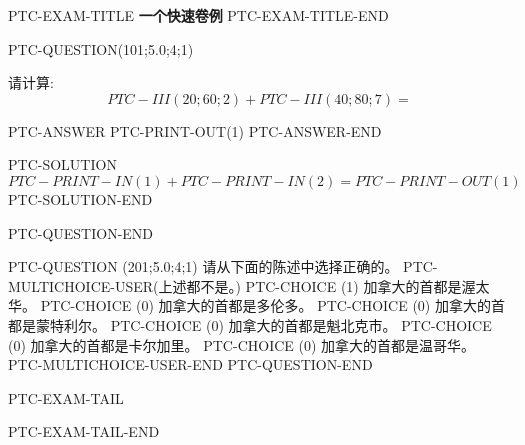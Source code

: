 \documentclass{ctexart}
\begin{document}
PTC-EXAM-TITLE
{\LARGE {\textbf{ 一个快速卷例}}}
PTC-EXAM-TITLE-END




PTC-QUESTION(101;5.0;4;1)

请计算: 
\begin{equation}
PTC-III (20; 60; 2) + PTC-III (40; 80; 7) = \nonumber 
\end{equation}

PTC-ANSWER
   PTC-PRINT-OUT(1)
PTC-ANSWER-END

PTC-SOLUTION
$PTC-PRINT-IN(1) + PTC-PRINT-IN(2)=  PTC-PRINT-OUT(1)$
PTC-SOLUTION-END

PTC-QUESTION-END




PTC-QUESTION  (201;5.0;4;1)
请从下面的陈述中选择正确的。
PTC-MULTICHOICE-USER(上述都不是。)
   PTC-CHOICE (1) 加拿大的首都是渥太华。
   PTC-CHOICE (0) 加拿大的首都是多伦多。
   PTC-CHOICE (0) 加拿大的首都是蒙特利尔。
   PTC-CHOICE (0) 加拿大的首都是魁北克市。
   PTC-CHOICE (0) 加拿大的首都是卡尔加里。
   PTC-CHOICE (0) 加拿大的首都是温哥华。
PTC-MULTICHOICE-USER-END
PTC-QUESTION-END




PTC-EXAM-TAIL

PTC-EXAM-TAIL-END
\end{document}
